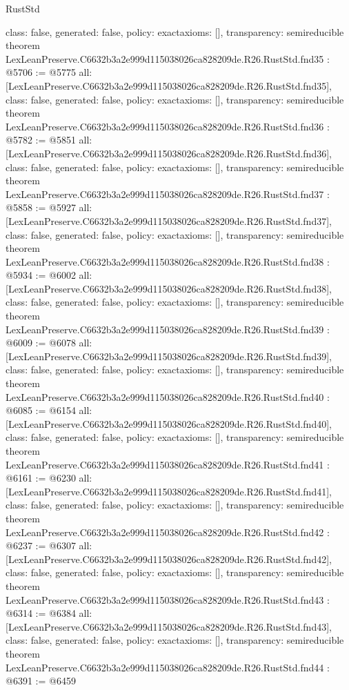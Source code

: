 \begin{lexlean}{RustStd}
\begin{coremodule}
{  class: false,
  generated: false,
  policy: exact{axioms: []},
  transparency: semireducible
}
theorem LexLeanPreserve.C6632b3a2e999d115038026ca828209de.R26.RustStd.fnd35 : @5706 := @5775 {
  all: [LexLeanPreserve.C6632b3a2e999d115038026ca828209de.R26.RustStd.fnd35],
  class: false,
  generated: false,
  policy: exact{axioms: []},
  transparency: semireducible
}
theorem LexLeanPreserve.C6632b3a2e999d115038026ca828209de.R26.RustStd.fnd36 : @5782 := @5851 {
  all: [LexLeanPreserve.C6632b3a2e999d115038026ca828209de.R26.RustStd.fnd36],
  class: false,
  generated: false,
  policy: exact{axioms: []},
  transparency: semireducible
}
theorem LexLeanPreserve.C6632b3a2e999d115038026ca828209de.R26.RustStd.fnd37 : @5858 := @5927 {
  all: [LexLeanPreserve.C6632b3a2e999d115038026ca828209de.R26.RustStd.fnd37],
  class: false,
  generated: false,
  policy: exact{axioms: []},
  transparency: semireducible
}
theorem LexLeanPreserve.C6632b3a2e999d115038026ca828209de.R26.RustStd.fnd38 : @5934 := @6002 {
  all: [LexLeanPreserve.C6632b3a2e999d115038026ca828209de.R26.RustStd.fnd38],
  class: false,
  generated: false,
  policy: exact{axioms: []},
  transparency: semireducible
}
theorem LexLeanPreserve.C6632b3a2e999d115038026ca828209de.R26.RustStd.fnd39 : @6009 := @6078 {
  all: [LexLeanPreserve.C6632b3a2e999d115038026ca828209de.R26.RustStd.fnd39],
  class: false,
  generated: false,
  policy: exact{axioms: []},
  transparency: semireducible
}
theorem LexLeanPreserve.C6632b3a2e999d115038026ca828209de.R26.RustStd.fnd40 : @6085 := @6154 {
  all: [LexLeanPreserve.C6632b3a2e999d115038026ca828209de.R26.RustStd.fnd40],
  class: false,
  generated: false,
  policy: exact{axioms: []},
  transparency: semireducible
}
theorem LexLeanPreserve.C6632b3a2e999d115038026ca828209de.R26.RustStd.fnd41 : @6161 := @6230 {
  all: [LexLeanPreserve.C6632b3a2e999d115038026ca828209de.R26.RustStd.fnd41],
  class: false,
  generated: false,
  policy: exact{axioms: []},
  transparency: semireducible
}
theorem LexLeanPreserve.C6632b3a2e999d115038026ca828209de.R26.RustStd.fnd42 : @6237 := @6307 {
  all: [LexLeanPreserve.C6632b3a2e999d115038026ca828209de.R26.RustStd.fnd42],
  class: false,
  generated: false,
  policy: exact{axioms: []},
  transparency: semireducible
}
theorem LexLeanPreserve.C6632b3a2e999d115038026ca828209de.R26.RustStd.fnd43 : @6314 := @6384 {
  all: [LexLeanPreserve.C6632b3a2e999d115038026ca828209de.R26.RustStd.fnd43],
  class: false,
  generated: false,
  policy: exact{axioms: []},
  transparency: semireducible
}
theorem LexLeanPreserve.C6632b3a2e999d115038026ca828209de.R26.RustStd.fnd44 : @6391 := @6459 {
}
\end{coremodule}
\end{lexlean}
